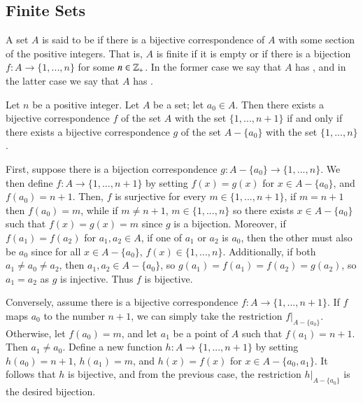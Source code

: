 \documentclass[12pt, a4paper, twoside, openright, titlepage]{book}
\begin{document}
\begin{appendices}
    \section{Finite Sets}

    \begin{defn}{}{}
        A set $A$ is said to be  if there is a bijective correspondence of $A$ with some section of the positive integers. That is, $A$ is finite if it is empty or if there is a bijection $f:A\rightarrow \{1,...,n\}$ for some $n \in \mathbb Z_+$. In the former case we say that $A$ has , and in the latter case we say that $A$ has .
    \end{defn}

    \begin{lem}{}{}
        Let $n$ be a positive integer. Let $A$ be a set; let $a_0 \in A$. Then there exists a bijective correspondence $f$ of the set $A$ with the set $\{1,...,n+1\}$ if and only if there exists a bijective correspondence $g$ of the set $A-\{a_0\}$ with the set $\{1,...,n\}$.
    \end{lem}
    \begin{proof*}{}{}
        First, suppose there is a bijection correspondence $g:A-\{a_0\}\rightarrow \{1,...,n\}$. We then define $f:A\rightarrow \{1,...,n+1\}$ by setting $f(x) = g(x)$ for $x \in A-\{a_0\}$, and $f(a_0) = n+1$. Then, $f$ is surjective for every $m \in \{1,...,n+1\}$, if $m = n+1$ then $f(a_0) = m$, while if $m \neq n+1$, $m \in \{1,...,n\}$ so there exists $x \in A-\{a_0\}$ such that $f(x) = g(x) = m$ since $g$ is a bijection. Moreover, if $f(a_1) = f(a_2)$ for $a_1,a_2 \in A$, if one of $a_1$ or $a_2$ is $a_0$, then the other must also be $a_0$ since for all $x \in A-\{a_0\}$, $f(x) \in \{1,...,n\}$. Additionally, if both $a_1 \neq a_0 \neq a_2$, then $a_1,a_2 \in A-\{a_0\}$, so $g(a_1) = f(a_1) = f(a_2) = g(a_2)$, so $a_1 = a_2$ as $g$ is injective. Thus $f$ is bijective. 

        Conversely, assume there is a bijective correspondence $f:A\rightarrow \{1,...,n+1\}$. If $f$ maps $a_0$ to the number $n+1$, we can simply take the restriction $f\rvert_{A-\{a_0\}}$. Otherwise, let $f(a_0) = m$, and let $a_1$ be a point of $A$ such that $f(a_1) = n+1$. Then $a_1 \neq a_0$. Define a new function $h:A\rightarrow \{1,...,n+1\}$ by setting $h(a_0) = n+1$, $h(a_1) = m$, and $h(x) = f(x)$ for $x \in A-\{a_0,a_1\}$. It follows that $h$ is bijective, and from the previous case, the restriction $h\rvert_{A-\{a_0\}}$ is the desired bijection.
    \end{proof*}



\end{appendices}
\end{document}
